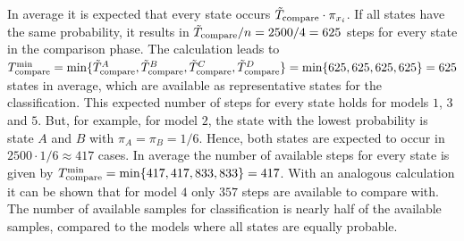 In average it is expected that every state  occurs $\tilde{T}_{\text{compare}} \cdot \pi_{x_i}$. If all states have the same probability, it results in $\tilde{T}_{\text{compare}} / n = 2500 / 4 = 625$ steps for every state in the comparison phase. The calculation leads to $T_{\text{compare}}^{\text{min}} = \min\{ \tilde{T}_{\text{compare}}^A, \tilde{T}_{\text{compare}}^B, \tilde{T}_{\text{compare}}^C, \tilde{T}_{\text{compare}}^D \} = \min\{ 625, 625, 625, 625 \} = 625$ states in average, which are available as representative states for the classification. This expected number of steps for every state holds for models $1$, $3$ and $5$. But, for example, for model $2$, the state with the lowest probability is state $A$ and $B$ with $\pi_A = \pi_B = 1/6$. Hence, both states are expected to occur in $2500 \cdot 1/6 \approx 417$ cases. In average the number of available steps for every state is given by $T_{\text{compare}}^{\text{min}} = \min\{ 417, 417, 833, 833 \} = 417$. With an analogous calculation it can be shown that for model $4$ only $357$ steps are available to compare with. The number of available samples for classification is nearly half of the available samples, compared to the models where all states are equally probable.

